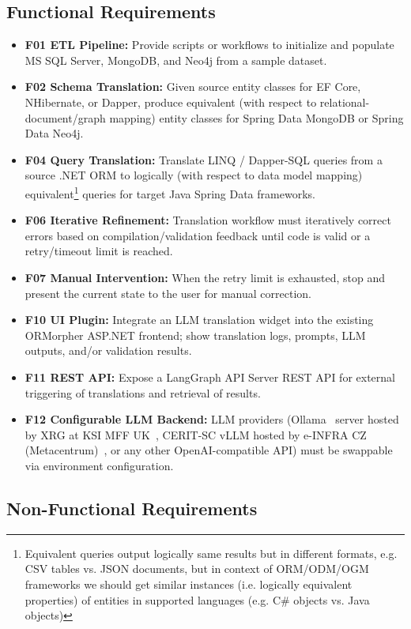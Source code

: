\documentclass{article}
\begin{document}
\subsection{Functional Requirements}

\begin{itemize}
  \item \textbf{F01 ETL Pipeline:} Provide scripts or workflows to initialize and populate MS SQL Server, MongoDB, and Neo4j from a sample dataset.
  \item \textbf{F02 Schema Translation:} Given source entity classes for EF Core, NHibernate, or Dapper, produce equivalent (with respect to relational-document/graph mapping) entity classes for Spring Data MongoDB or Spring Data Neo4j.
  \item \textbf{F04 Query Translation:} Translate LINQ / Dapper-SQL queries from a source .NET ORM to logically (with respect to data model mapping) equivalent\footnote{Equivalent queries output logically same results but in different formats, e.g. CSV tables vs. JSON documents, but in context of ORM/ODM/OGM frameworks we should get similar instances (i.e. logically equivalent properties) of entities in supported languages (e.g. C\# objects vs. Java objects)} queries for target Java Spring Data frameworks.
  \item \textbf{F06 Iterative Refinement:} Translation workflow must iteratively correct errors based on compilation/validation feedback until code is valid or a retry/timeout limit is reached.
  \item \textbf{F07 Manual Intervention:} When the retry limit is exhausted, stop and present the current state to the user for manual correction.
  \item \textbf{F10 UI Plugin:} Integrate an LLM translation widget into the existing ORMorpher ASP.NET frontend; show translation logs, prompts, LLM outputs, and/or validation results.
  \item \textbf{F11 REST API:} Expose a LangGraph API Server REST API for external triggering of translations and retrieval of results.
  \item \textbf{F12 Configurable LLM Backend:} LLM providers (Ollama~\cite{ollama} server hosted by XRG at KSI MFF UK~\cite{xrg-mff}, CERIT-SC vLLM hosted by e-INFRA CZ (Metacentrum)~\cite{einfra}, or any other OpenAI-compatible API) must be swappable via environment configuration.
\end{itemize}

\subsection{Non-Functional Requirements}
\end{document}

